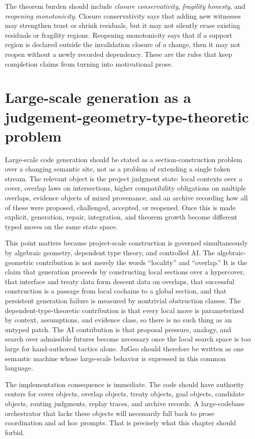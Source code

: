 \documentclass[11pt]{report}
\begin{document}
The theorem burden should include \emph{closure conservativity}, \emph{fragility honesty}, and \emph{reopening monotonicity}. Closure conservativity says that adding new witnesses may strengthen trust or shrink residuals, but it may not silently erase existing residuals or fragility regions. Reopening monotonicity says that if a support region is declared outside the invalidation closure of a change, then it may not reopen without a newly recorded dependency. These are the rules that keep completion claims from turning into motivational prose.

\chapter{Large-scale generation as a judgement-geometry-type-theoretic problem}
Large-scale code generation should be stated as a section-construction problem over a changing semantic site, not as a problem of extending a single token stream. The relevant object is the project judgment state: local contexts over a cover, overlap laws on intersections, higher compatibility obligations on multiple overlaps, evidence objects of mixed provenance, and an archive recording how all of these were proposed, challenged, accepted, or reopened. Once this is made explicit, generation, repair, integration, and theorem growth become different typed moves on the same state space.

This point matters because project-scale construction is governed simultaneously by algebraic geometry, dependent type theory, and controlled AI. The algebraic-geometric contribution is not merely the words ``locality'' and ``overlap.'' It is the claim that generation proceeds by constructing local sections over a hypercover, that interface and treaty data form descent data on overlaps, that successful construction is a passage from local cochains to a global section, and that persistent generation failure is measured by nontrivial obstruction classes. The dependent-type-theoretic contribution is that every local move is parameterized by context, assumptions, and evidence class, so there is no such thing as an untyped patch. The AI contribution is that proposal pressure, analogy, and search over admissible futures become necessary once the local search space is too large for hand-authored tactics alone. JuGeo should therefore be written as one semantic machine whose large-scale behavior is expressed in this common language.

The implementation consequence is immediate. The code should have authority centers for cover objects, overlap objects, treaty objects, goal objects, candidate objects, routing judgments, replay traces, and archive records. A large-codebase orchestrator that lacks these objects will necessarily fall back to prose coordination and ad hoc prompts. That is precisely what this chapter should forbid.
\end{document}
